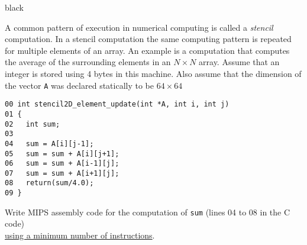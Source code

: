 \documentclass[psfig,11pt]{article}
\newif\ifsol
\begin{document}
\newenvironment{question}[1][??]{\noindent{\bf Question  \stepcounter{quest}
\arabic{quest} (\textrm{#1} points): }}


\color{black}

\begin{question}[25] A common pattern of execution in numerical computing is called a {\em stencil} computation. In a stencil computation the same computing pattern is repeated for multiple elements of an array. An example is a computation that computes the average of the surrounding elements in an $N\times N$ array. Assume that an integer is stored using 4 bytes in this machine. Also assume that the dimension of the vector {\tt A} was declared statically to be $64\times 64$

\begin{verbatim}
00 int stencil2D_element_update(int *A, int i, int j)
01 {
02   int sum;
03   
04   sum = A[i][j-1];
05   sum = sum + A[i][j+1];
06   sum = sum + A[i-1][j];
07   sum = sum + A[i+1][j];
08   return(sum/4.0);
09 }
\end{verbatim}

Write MIPS assembly code for the computation of {\tt  sum} (lines 04 to 08 in the C code)\\ \underline{using a minimum number of instructions}.

\ifsol
 \color{red}
 \begin{tabular}{lll}
\verb| sll| & \verb| $t0, $a1, 8   |     & \verb| # $t0 <-- 4*i*N = 4*i*64 = 256*i = i<<8 |\\
\verb| sll| & \verb| $t1, $a2, 2   |     & \verb| # $t1 <-- 4*j |\\
\verb| add| & \verb| $t2, $a0, $t0|     & \verb| # $t2 <-- A + $t0 = A + 4*i*N |\\
\verb| add| & \verb| $t2, $t2, $t1 |     & \verb| # $t2 <-- A + 4*i*N + j*4 = Address(A[i][j]) |\\
\verb| lw| & \verb| $t3, -4($t2)  |     & \verb| # sum = $t3 <-- A[i][j-1] |\\
\verb| lw| & \verb| $t4, 4($t2)   |     & \verb| # $t4 <- A[i][j+1] |\\
\verb| add| & \verb| $t3, $t3, $t4|      & \verb| # sum <-- sum + A[i][j+1] |\\
\verb| lw| & \verb| $t4, -256($t2)|   & \verb| # $t4 <- A[i-1][j] |\\
\verb| add| & \verb| $t3, $t3, $t4  |    & \verb| # sum <- sum + A[i-1][j] |\\
\verb| lw| & \verb| $t4, 256($t2)|    & \verb| # $t4 <- A[i+1][j] |\\
\verb| add | & \verb| $t3, $t3, $t4  |    & \verb| # sum <- sum + A[i+1][j] |
\end{tabular}
 \color{black}
 \else
 \vspace{0.5in}
 \fi
\end{question}
\end{document}
